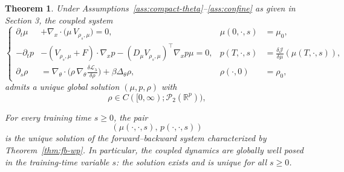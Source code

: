 \documentclass[11pt,a4wide]{article}
\newtheorem{theorem}{Theorem}[section]
\theoremstyle{definition}
\newcommand{\R}{\mathbb{R}}
\newcommand{\Prob}{\mathcal{P}}
\begin{document}
\begin{theorem} 
	Under Assumptions~\ref{ass:compact-theta}--\ref{ass:confine} as given in Section 3,  the coupled system 
	\begin{equation}
		\left\{
		\begin{aligned}
			\partial_t\mu &+ \nabla_x\cdot\big(\mu\,V_{\rho_s,\mu}\big) = 0, & \mu(0,\cdot,s)&=\mu_0,\\
			-\partial_tp &- (V_{\rho_s,\mu}+F)\cdot\nabla_xp - (D_\mu V_{\rho_s,\mu})^\top \nabla_x p \mu  = 0, & p(T,\cdot,s) &= \tfrac{\delta\mathcal J}{\delta\mu}(\mu(T,\cdot,s)),\\
			\partial_s\rho &= \nabla_\theta\cdot\big(\rho\,\nabla_\theta\tfrac{\delta\mathcal L_\lambda}{\delta\rho}\big) + \beta\Delta_\theta\rho, & \rho(\cdot,0) &= \rho_0,
		\end{aligned}
		\right.
	\end{equation}	
admits a unique global solution $(\mu,p,\rho)$ with 
$$\rho\in C([0,\infty);\Prob_2(\R^p)),
$$

For every training time $s\ge0$, the pair
	\[
	(\mu(\cdot,\cdot,s),\,p(\cdot,\cdot,s))
	\]
	is the unique solution of the forward--backward system characterized by
	Theorem~\ref{thm:fb-wp}. In particular, the coupled dynamics are globally
	well posed in the training-time variable $s$:  the solution exists
	and is unique for all $s\ge0$.
\end{theorem}
\end{document}

